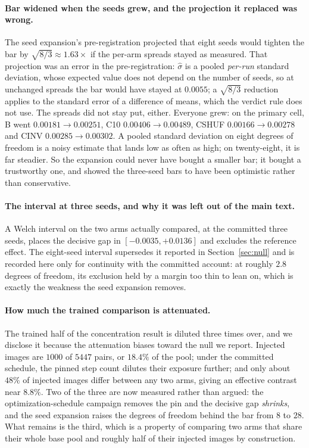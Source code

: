 \documentclass{article}
\begin{document}
\paragraph{Bar widened when the seeds grew, and the projection it replaced was wrong.} The seed
expansion's pre-registration projected that eight seeds would tighten the bar by
$\sqrt{8/3} \approx 1.63\times$ if the per-arm spreads stayed as measured. That projection was an
error in the pre-registration: $\hat{\sigma}$ is a pooled \emph{per-run} standard deviation, whose
expected value does not depend on the number of seeds, so at unchanged spreads the bar would have
stayed at $0.0055$; a $\sqrt{8/3}$ reduction applies to the standard error of a difference of means,
which the verdict rule does not use. The spreads did not stay put, either. Everyone grew: on the primary cell, B went $0.00181 \rightarrow 0.00251$, C10 $0.00406 \rightarrow 0.00489$, CSHUF
$0.00166 \rightarrow 0.00278$ and CINV $0.00285 \rightarrow 0.00302$. A pooled standard deviation
on eight degrees of freedom is a noisy estimate that lands low as often as high; on twenty-eight, it
is far steadier. So the expansion could never have bought a smaller bar; it bought a trustworthy
one, and showed the three-seed bars to have been optimistic rather than conservative.



\paragraph{The interval at three seeds, and why it was left out of the main text.} A Welch interval on the two
arms actually compared, at the committed three seeds, places the decisive gap in
$[-0.0035, +0.0136]$ and excludes the reference effect. The eight-seed interval supersedes it
reported in Section~\ref{sec:null} and is recorded here only for continuity with the committed
account: at roughly $2.8$ degrees of freedom, its exclusion held by a margin too thin to lean on,
which is exactly the weakness the seed expansion removes.



\paragraph{How much the trained comparison is attenuated.} The trained half of the concentration
result is diluted three times over, and we disclose it because the attenuation biases toward the
null we report. Injected images are $1000$ of $5447$ pairs, or $18.4\%$ of the pool; under the
committed schedule, the pinned step count dilutes their exposure further; and only about $48\%$ of
injected images differ between any two arms, giving an effective contrast near $8.8\%$. Two of the
three are now measured rather than argued: the optimization-schedule campaign removes the pin and
the decisive gap \emph{shrinks}, and the seed expansion raises the degrees of freedom behind the
bar from $8$ to $28$. What remains is the third, which is a property of comparing two arms that
share their whole base pool and roughly half of their injected images by construction.
\end{document}
